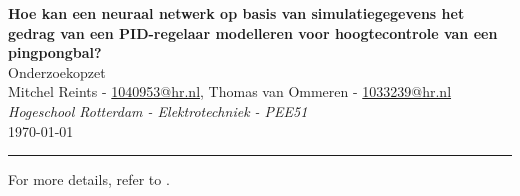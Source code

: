 \documentclass[a4paper,9pt]{extarticle}
\begin{document}
\pagestyle{fancy}
\thispagestyle{empty}
\fancyfoot[C]{}
\renewcommand*{\thefootnote}{\fnsymbol{footnote}}
\begin{center}
  \huge{\textbf{Hoe kan een neuraal netwerk op basis van simulatiegegevens het gedrag van een PID-regelaar modelleren voor hoogtecontrole van een pingpongbal?}} \\
  \vspace{0.2cm}
  \large{Onderzoekopzet}
\vspace{0.2cm}
\normalsize
\\ Mitchel Reints - \href{mailto:1040953@hr.nl}{1040953@hr.nl}, Thomas van Ommeren - \href{mailto:1033239@hr.nl}{1033239@hr.nl}\\
\vspace{0.1cm}
\textit{Hogeschool Rotterdam - Elektrotechniek - PEE51} 
\vspace{0.1cm} \\
\today
\medskip
\normalsize
\end{center}
{\color{gray}\hrule}
\vspace{0.4cm}






For more details, refer to \cite{Bowker1985}.




\end{document}

